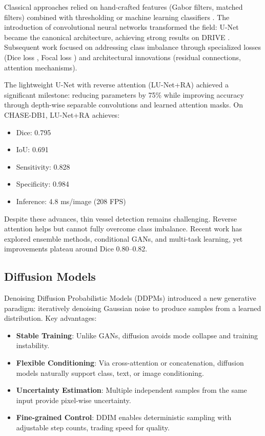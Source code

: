 \documentclass[11pt]{article}
\begin{document}
Classical approaches relied on hand-crafted features (Gabor filters, matched filters) combined with thresholding or machine learning classifiers \cite{Soares2006,Mendonca2006}. The introduction of convolutional neural networks transformed the field: U-Net \cite{Ronneberger2015} became the canonical architecture, achieving strong results on DRIVE \cite{Staal2004}. Subsequent work focused on addressing class imbalance through specialized losses (Dice loss \cite{Milletari2016}, Focal loss \cite{Lin2017}) and architectural innovations (residual connections, attention mechanisms).

The lightweight U-Net with reverse attention (LU-Net+RA) \cite{LU2023} achieved a significant milestone: reducing parameters by 75\% while improving accuracy through depth-wise separable convolutions and learned attention masks. On CHASE-DB1, LU-Net+RA achieves:
\begin{itemize}
    \item Dice: 0.795
    \item IoU: 0.691
    \item Sensitivity: 0.828
    \item Specificity: 0.984
    \item Inference: 4.8 ms/image (208 FPS)
\end{itemize}

Despite these advances, thin vessel detection remains challenging. Reverse attention helps but cannot fully overcome class imbalance. Recent work has explored ensemble methods, conditional GANs, and multi-task learning, yet improvements plateau around Dice 0.80--0.82.

\subsection{Diffusion Models}

Denoising Diffusion Probabilistic Models (DDPMs) \cite{Ho2020} introduced a new generative paradigm: iteratively denoising Gaussian noise to produce samples from a learned distribution. Key advantages:
\begin{itemize}
    \item \textbf{Stable Training}: Unlike GANs, diffusion avoids mode collapse and training instability.
    \item \textbf{Flexible Conditioning}: Via cross-attention or concatenation, diffusion models naturally support class, text, or image conditioning.
    \item \textbf{Uncertainty Estimation}: Multiple independent samples from the same input provide pixel-wise uncertainty.
    \item \textbf{Fine-grained Control}: DDIM \cite{Song2021} enables deterministic sampling with adjustable step counts, trading speed for quality.
\end{itemize}
\end{document}
